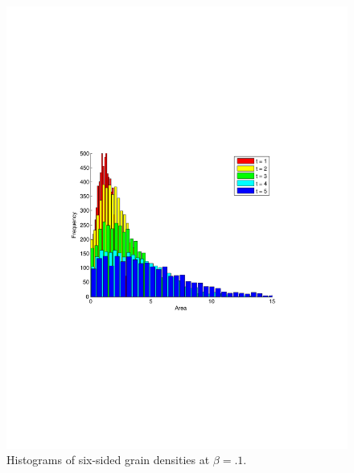 \begin{figure}
\includegraphics[width=\textwidth]{histbetatenthtier6.pdf}
\vspace{-130pt}
\caption{Histograms of six-sided grain densities at $\beta = .1$.}
\end{figure}

